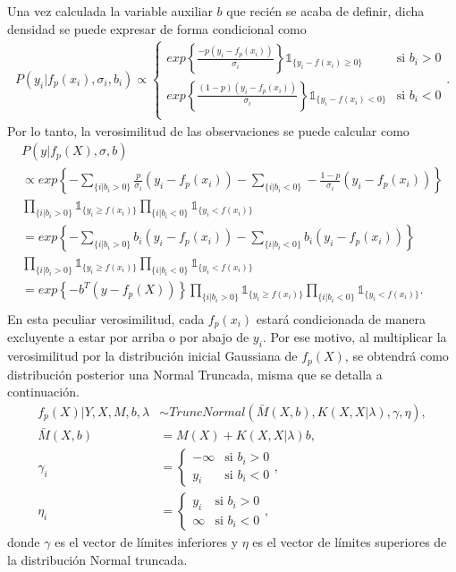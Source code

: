 Una vez calculada la variable auxiliar $b$ que reci\'en se acaba de definir, dicha densidad se puede expresar de forma condicional como
\begin{gather*}
    P(y_i | f_p(x_i),\sigma_i,b_i) \propto
    \begin{cases}
        exp \left\{
            \frac{-p(y_i-f_p(x_i))}{\sigma_i}
        \right\} \mathds{1}_{\{y_i - f(x_i) \geq 0\}} 
        &\text{si } b_i > 0\\
        exp \left\{
            \frac{(1-p)(y_i-f_p(x_i))}{\sigma_i}
        \right\} \mathds{1}_{\{y_i - f(x_i) < 0\}} 
        &\text{si } b_i < 0\\
    \end{cases}.
\end{gather*}
Por lo tanto, la verosimilitud de las observaciones se puede calcular como
\begin{gather*}
    P(y | f_p(X),\sigma,b) \\
    \propto exp \left\{
        -\sum_{\{i|b_i > 0\}} \frac{p}{\sigma_i}(y_i-f_p(x_i)) -
        \sum_{\{i|b_i < 0\}} -\frac{1-p}{\sigma_i}(y_i-f_p(x_i))
    \right\} \\
    \prod_{\{i|b_i > 0\}}\mathds{1}_{\{y_i \geq f(x_i)\}}
    \prod_{\{i|b_i < 0\}}\mathds{1}_{\{y_i < f(x_i)\}}\\
    = exp \left\{
        -\sum_{\{i|b_i > 0\}} b_i(y_i-f_p(x_i)) -
        \sum_{\{i|b_i < 0\}} b_i(y_i-f_p(x_i))
    \right\} \\
    \prod_{\{i|b_i > 0\}}\mathds{1}_{\{y_i \geq f(x_i)\}}
    \prod_{\{i|b_i < 0\}}\mathds{1}_{\{y_i < f(x_i)\}}\\
    = exp \left\{-b^T(y-f_p(X))
    \right\}
    \prod_{\{i|b_i > 0\}}\mathds{1}_{\{y_i \geq f(x_i)\}}
    \prod_{\{i|b_i < 0\}}\mathds{1}_{\{y_i < f(x_i)\}}.\\
\end{gather*}
En esta peculiar verosimilitud, cada $f_p(x_i)$ estar\'a condicionada de manera excluyente a estar por arriba o por abajo de $y_i$. Por ese motivo, al multiplicar la verosimilitud por la distribuci\'on inicial Gaussiana de $f_p(X)$, se obtendr\'a como distribuci\'on posterior una Normal Truncada, misma que se detalla a continuaci\'on.
\begin{equation*}
\begin{aligned}
   f_p(X)|Y,X,M,b,\lambda &\sim TruncNormal(\bar{M}(X,b), K(X,X|\lambda), \gamma, \eta), \\
   \bar{M}(X,b) &= M(X) + K(X,X|\lambda)b, \\
   \gamma_i &= 
   \begin{cases}
    -\infty & \text{si }b_i > 0 \\
    y_i & \text{si }b_i < 0
   \end{cases},\\
   \eta_i &= 
   \begin{cases}
    y_i & \text{si }b_i > 0 \\
    \infty & \text{si }b_i < 0
   \end{cases},
\end{aligned}
\end{equation*}
donde $\gamma$ es el vector de l\'imites inferiores y $\eta$ es el vector de l\'imites superiores de la distribuci\'on Normal truncada.


